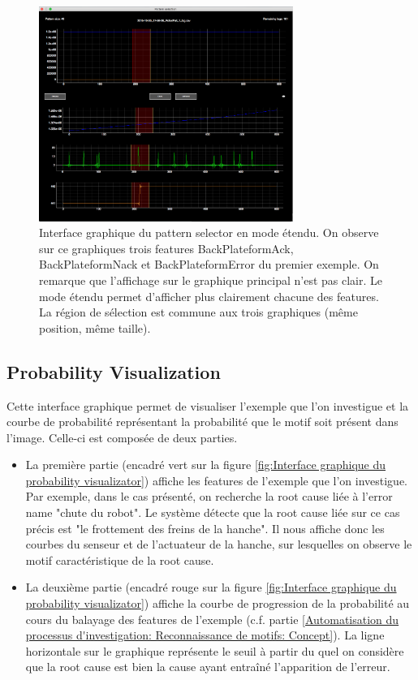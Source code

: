 \begin{figure}[h]
	\centering\includegraphics[height=7cm]{images/pattern_selector_ext.png}
	\caption[Interface graphique du pattern selector en mode étendu]{Interface graphique du pattern selector en mode étendu. On observe sur ce graphiques trois features BackPlateformAck, BackPlateformNack et BackPlateformError du premier exemple. On remarque que l'affichage sur le graphique principal n'est pas clair. Le mode étendu permet d'afficher plus clairement chacune des features. La région de sélection est commune aux trois graphiques (même position, même taille).}
	\label{fig:Interface graphique du pattern selector en mode étendu}
\end{figure}

\subsection{Probability Visualization}
\label{Industrialisation du produit: Outils graphiques: Probability Visualization}
Cette interface graphique permet de visualiser l'exemple que l'on investigue et la courbe de probabilité représentant la probabilité que le motif soit présent dans l'image. Celle-ci est composée de deux parties. 
\begin{itemize}
	\item La première partie (encadré vert sur la figure \ref{fig:Interface graphique du probability visualizator}) affiche les features de l'exemple que l'on investigue. Par exemple, dans le cas présenté, on recherche la root cause liée à l'error name "chute du robot". Le système détecte que la root cause liée sur ce cas précis est "le frottement des freins de la hanche". Il nous affiche donc les courbes du senseur et de l'actuateur de la hanche, sur lesquelles on observe le motif caractéristique de la root cause. 
	\item La deuxième partie (encadré rouge sur la figure \ref{fig:Interface graphique du probability visualizator}) affiche la courbe de progression de la probabilité au cours du balayage des features de l'exemple (c.f. partie \ref{Automatisation du processus d'investigation: Reconnaissance de motifs: Concept}). La ligne horizontale sur le graphique représente le seuil à partir du quel on considère que la root cause est bien la cause ayant entraîné l'apparition de l'erreur.
\end{itemize}

